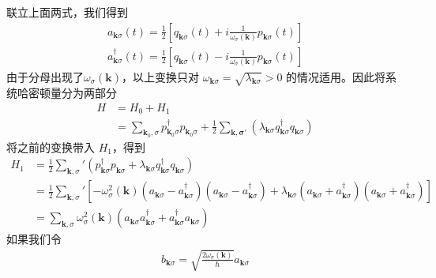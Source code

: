 联立上面两式，我们得到
\begin{equation}
    \begin{aligned} 
        a_{\mathbf{k}\sigma} (t) = \frac{1}{2}[ q_{\mathbf{k}\sigma}(t) + i\frac{1}{\omega_\sigma (\mathbf{k} )}
        p_{\mathbf{k}\sigma}(t)] \\ 
        a^\dagger_{\mathbf{k}\sigma} (t) = \frac{1}{2}[ q_{\mathbf{k}\sigma}(t) - i\frac{1}{\omega_\sigma (\mathbf{k} )}
        p_{\mathbf{k}\sigma}(t)] 
    \end{aligned} 
\end{equation}
由于分母出现了$\omega_\sigma (\mathbf{k} )$，以上变换只对 $ \omega_{\mathbf{k}\sigma } = \sqrt{\lambda_{\mathbf{k}\sigma }} >0 $
的情况适用。因此将系统哈密顿量分为两部分
\begin{equation}
    \begin{aligned} 
    H &= H_0 + H_1 \\
     &= \sum_{\mathbf{k}_0,\sigma }p^\dagger_{\mathbf{k}_0\sigma }p_{\mathbf{k}_0\sigma } 
     + \frac{1}{2}\sum_{\mathbf{k,\sigma }'} (\lambda_{\mathbf{k}\sigma }q_{\mathbf{k}\sigma }^\dagger q_{\mathbf{k}\sigma })
    \end{aligned} 
\end{equation} 
将之前的变换带入 $ H_1 $，得到
\begin{equation}
    \begin{aligned} 
    H_1 &= \frac{1}{2}\sum_{\mathbf{k},\sigma }' (p^\dagger_{\mathbf{k}\sigma }p_{\mathbf{k}\sigma }+\lambda_{\mathbf{k}\sigma }q_{\mathbf{k}\sigma }^\dagger q_{\mathbf{k}\sigma })\\
        &= \frac{1}{2}\sum_{\mathbf{k},\sigma}' [ - \omega_\sigma^2 (\mathbf{k})(a_{\mathbf{k}\sigma} - a^\dagger_{\mathbf{k}\sigma })(a_{\mathbf{k}\sigma} - a^\dagger_{\mathbf{k}\sigma })
        + \lambda_{\mathbf{k}\sigma } (a_{\mathbf{k}\sigma}  + a^\dagger_{\mathbf{k}\sigma })(a_{\mathbf{k}\sigma}  + a^\dagger_{\mathbf{k}\sigma })] \\
        & = \sum_{\mathbf{k},\sigma} \omega_\sigma^2(\mathbf{k} ) (a_{\mathbf{k}\sigma }a^\dagger_{\mathbf{k}\sigma } + a^\dagger_{\mathbf{k}\sigma } a_{\mathbf{k}\sigma })
    \end{aligned} 
\end{equation} 
如果我们令
\begin{equation}
    \begin{aligned} 
    b_{\mathbf{k}\sigma } = \sqrt{\frac{2\omega_\sigma(\mathbf{k} )}{\hbar}} a_{\mathbf{k}\sigma }
    \end{aligned} 
\end{equation}
